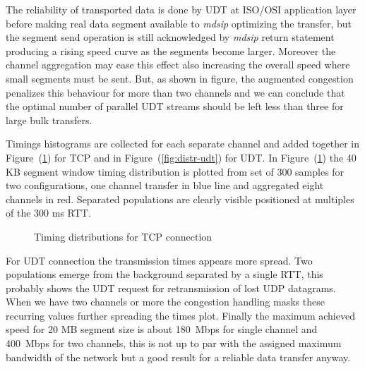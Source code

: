\documentclass[10pt,a4paper]{article}
\begin{document}
The reliability of transported data is done by UDT at ISO/OSI application layer before making real data segment available to \emph{mdsip} optimizing the transfer, but the segment send operation is still acknowledged by \emph{mdsip} return statement producing a rising speed curve as the segments become larger.
Moreover the channel aggregation may ease this effect also increasing the overall speed where small segments must be sent.
But, as shown in figure, the augmented congestion penalizes this behaviour for more than two channels and we can conclude that the optimal number of parallel UDT streams should be left less than three for large bulk transfers.

Timings histograms are collected for each separate channel and added together in Figure~(\ref{fig:distr-tcp}) for TCP and in Figure~(\ref{fig:distr-udt}) for UDT.
In Figure~(\ref{fig:distr-tcp}) the 40 KB segment window timing distribution is plotted from set of 300 samples for two configurations, one channel transfer in blue line and aggregated eight channels in red.
Separated populations are clearly visible positioned at multiples of the 300 ms RTT.
~
\begin{figure}[ht]
\centerline{
}
\caption[]
{ Timing distributions for TCP connection }
\label{fig:distr-tcp}
\end{figure}

For UDT connection the transmission times appears more spread.
Two populations emerge from the background separated by a single RTT, this probably shows the UDT request for retransmission of lost UDP datagrams.
When we have two channels or more the congestion handling masks these recurring values further spreading the times plot.
Finally the maximum achieved speed for 20 MB segment size is about 180~Mbps for single channel and 400~Mbps for two channels, this is not up to par with the assigned maximum bandwidth of the network but a good result for a reliable data transfer anyway.
\end{document}
